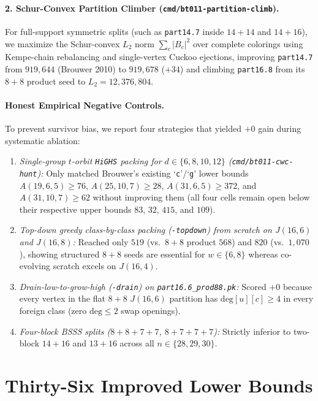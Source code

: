 \documentclass[11pt,letterpaper]{article}
\theoremstyle{plain}
\theoremstyle{definition}
\theoremstyle{remark}
\begin{document}
\paragraph{2. Schur-Convex Partition Climber (\texttt{cmd/bt011-partition-climb}).}
For full-support symmetric splits (such as \texttt{part14.7} inside $14{+}14$ and $14{+}16$), we maximize the Schur-convex $L_2$ norm $\sum_c |B_c|^2$ over complete colorings using Kempe-chain rebalancing and single-vertex Cuckoo ejections, improving \texttt{part14.7} from $919{,}644$ (Brouwer 2010) to $919{,}678$ ($+34$) and climbing \texttt{part16.8} from its $8{+}8$ product seed to $L_2 = 12{,}376{,}804$.

\paragraph{Honest Empirical Negative Controls.}
To prevent survivor bias, we report four strategies that yielded $+0$ gain during systematic ablation:
\begin{enumerate}[leftmargin=1.5em,itemsep=1pt]
    \item \emph{Single-group $t$-orbit \texttt{HiGHS} packing for $d \in \{6, 8, 10, 12\}$ (\texttt{cmd/bt011-cwc-hunt}):} Only matched Brouwer's existing `\texttt{c}'/`\texttt{g}' lower bounds $A(19,6,5) \ge 76$, $A(25,10,7) \ge 28$, $A(31,6,5) \ge 372$, and $A(31,10,7) \ge 62$ without improving them (all four cells remain open below their respective upper bounds $83$, $32$, $415$, and $109$).
    \item \emph{Top-down greedy class-by-class packing (\texttt{-topdown}) from scratch on $J(16, 6)$ and $J(16, 8)$:} Reached only $519$ (vs.\ $8{+}8$ product $568$) and $820$ (vs.\ $1{,}070$), showing structured $8{+}8$ seeds are essential for $w \in \{6, 8\}$ whereas co-evolving scratch excels on $J(16, 4)$.
    \item \emph{Drain-low-to-grow-high (\texttt{-drain}) on \texttt{part16.6\_prod88.pk}:} Scored $+0$ because every vertex in the flat $8{+}8$ $J(16, 6)$ partition has $\mathrm{deg}[u][c] \ge 4$ in every foreign class (zero $\mathrm{deg} \le 2$ swap openings).
    \item \emph{Four-block BSSS splits ($8{+}8{+}7{+}7$, $8{+}7{+}7{+}7$):} Strictly inferior to two-block $14{+}16$ and $13{+}16$ across all $n \in \{28, 29, 30\}$.
\end{enumerate}

\section{Thirty-Six Improved Lower Bounds}
\label{sec:results}
\end{document}
